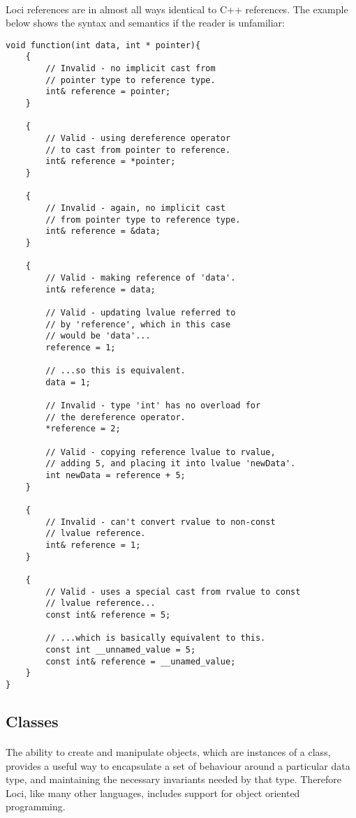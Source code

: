 \documentclass[12pt,twoside,notitlepage]{report}
\begin{document}
\paragraph{}
Loci references are in almost all ways identical to C++ references. The example below shows the syntax and semantics if the reader is unfamiliar:

\begin{lstlisting}
void function(int data, int * pointer){
	{
		// Invalid - no implicit cast from
		// pointer type to reference type.
		int& reference = pointer;
	}
	
	{
		// Valid - using dereference operator
		// to cast from pointer to reference.
		int& reference = *pointer;
	}
	
	{
		// Invalid - again, no implicit cast
		// from pointer type to reference type.
		int& reference = &data;
	}
	
	{
		// Valid - making reference of 'data'.
		int& reference = data;
	
		// Valid - updating lvalue referred to
		// by 'reference', which in this case
		// would be 'data'...
		reference = 1;
		
		// ...so this is equivalent.
		data = 1;
		
		// Invalid - type 'int' has no overload for
		// the dereference operator.
		*reference = 2;
		
		// Valid - copying reference lvalue to rvalue,
		// adding 5, and placing it into lvalue 'newData'.
		int newData = reference + 5;
	}
	
	{
		// Invalid - can't convert rvalue to non-const
		// lvalue reference.
		int& reference = 1;
	}
	
	{	
		// Valid - uses a special cast from rvalue to const
		// lvalue reference...
		const int& reference = 5;
		
		// ...which is basically equivalent to this.
		const int __unnamed_value = 5;
		const int& reference = __unamed_value;
	}
}
\end{lstlisting}

\clearpage

\subsection{Classes}

\paragraph{}
The ability to create and manipulate objects, which are instances of a class, provides a useful way to encapsulate a set of behaviour around a particular data type, and maintaining the necessary invariants needed by that type. Therefore Loci, like many other languages, includes support for object oriented programming.
\end{document}
